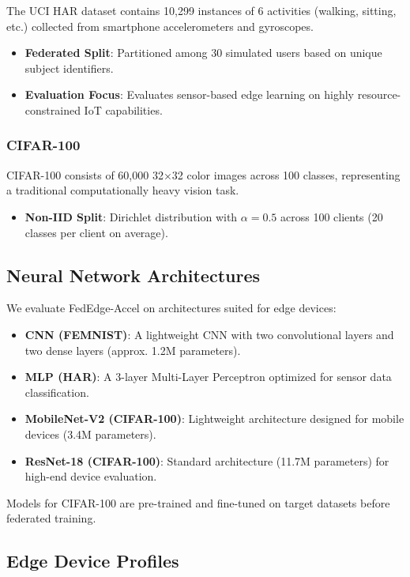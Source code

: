 \documentclass[journal]{IEEEtran}
\begin{document}
The UCI HAR dataset contains 10,299 instances of 6 activities (walking, sitting, etc.) collected from smartphone accelerometers and gyroscopes.
\begin{itemize}
    \item \textbf{Federated Split}: Partitioned among 30 simulated users based on unique subject identifiers.
    \item \textbf{Evaluation Focus}: Evaluates sensor-based edge learning on highly resource-constrained IoT capabilities.
\end{itemize}

\subsubsection{CIFAR-100}

CIFAR-100 consists of 60,000 32×32 color images across 100 classes, representing a traditional computationally heavy vision task.
\begin{itemize}
    \item \textbf{Non-IID Split}: Dirichlet distribution with $\alpha = 0.5$ across 100 clients (20 classes per client on average).
\end{itemize}

\subsection{Neural Network Architectures}

We evaluate FedEdge-Accel on architectures suited for edge devices:

\begin{itemize}
    \item \textbf{CNN (FEMNIST)}: A lightweight CNN with two convolutional layers and two dense layers (approx. 1.2M parameters).
    \item \textbf{MLP (HAR)}: A 3-layer Multi-Layer Perceptron optimized for sensor data classification.
    \item \textbf{MobileNet-V2 (CIFAR-100)}: Lightweight architecture designed for mobile devices (3.4M parameters).
    \item \textbf{ResNet-18 (CIFAR-100)}: Standard architecture (11.7M parameters) for high-end device evaluation.
\end{itemize}

Models for CIFAR-100 are pre-trained and fine-tuned on target datasets before federated training.

\subsection{Edge Device Profiles}
\end{document}
